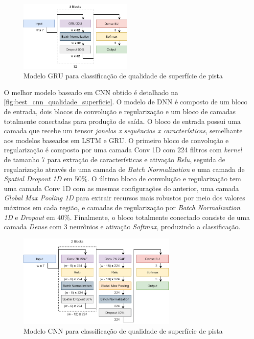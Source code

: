 \begin{figure}[h!]
  \centering
  \caption{Modelo GRU para classificação de qualidade de superfície de pista}
  \label{fig:best_gru_qualidade_superficie}
  \includegraphics[width=0.5\textwidth]{figuras/fig_47.png}
\end{figure}

O melhor modelo baseado em CNN obtido é detalhado na \autoref{fig:best_cnn_qualidade_superficie}. O modelo de DNN é composto de um bloco de entrada, dois blocos de convolução e regularização e um bloco de camadas totalmente conectadas para produção de saída. O bloco de entrada possui uma camada que recebe um tensor \emph{janelas x sequências x características}, semelhante aos modelos baseados em LSTM e GRU. O primeiro bloco de convolução e regularização é composto por uma camada Conv 1D com 224 filtros com \textit{kernel} de tamanho 7 para extração de características e ativação \textit{Relu}, seguida de regularização através de uma camada de \textit{Batch Normalization} e uma camada de \textit{Spatial Dropout 1D} em 50\%. O último bloco de convolução e regularização tem uma camada Conv 1D com as mesmas configurações do anterior, uma camada \textit{Global Max Pooling 1D} para extrair recursos mais robustos por meio dos valores máximos em cada região, e camadas de regularização por \textit{Batch Normalization 1D} e \textit{Dropout} em 40\%. Finalmente, o bloco totalmente conectado consiste de uma camada \textit{Dense} com 3 neurônios e ativação \textit{Softmax}, produzindo a classificação.

\begin{figure}[h!]
  \centering
  \caption{Modelo CNN para classificação de qualidade de superfície de pista}
  \label{fig:best_cnn_qualidade_superficie}
  \includegraphics[width=0.7\textwidth]{figuras/fig_48.png}
\end{figure}

